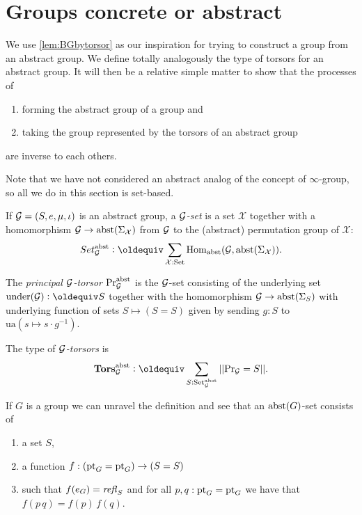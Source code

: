 \section{Groups concrete or abstract%
}
\label{sec:Gsetforabstract}

We use \cref{lem:BGbytorsor} as our inspiration for trying to construct a group from an abstract group.  We define totally analogously the type of torsors for an abstract group.  It will then be a relative simple matter to show that the processes of
\begin{enumerate}
\item forming the abstract group of a group and 
\item taking the group represented by the torsors of an abstract group
\end{enumerate}
 are inverse to each others.

Note that we have not considered an abstract analog of the concept of $\infty$-group, so all we do in this section is set-based.

\begin{definition}
\label{def:abstrGtorsors}
  If ${\mathcal G}=(S,e,\mu,\iota)$ is an abstract group, a \emph{$\mathcal G$-set} is a set $\mathcal X$ together with a homomorphism
$\mathcal G\to\mathrm{abst}(\Sigma_{\mathcal X})$
from $\mathcal G$ to the (abstract) permutation group of $\mathcal X$:
$$Set_{\agp G}^\abstr\defequi \sum_{\mathcal X:\Set}\Hom_\abstr({\agp G},\abstr(\Sigma_{\mathcal X})).$$

The \emph{principal ${\mathcal G}$-torsor} $\mathrm{Pr}_{{\mathcal G}}^{\mathrm{abst}}$ is the ${\mathcal G}$-set consisting of the underlying set $\mathrm{under}({\agp G})\defequi S$ together with the homomorphism ${\mathcal G}\to\mathrm{abst}(\Sigma_{S})$ with underlying function of sets $S\mapsto (S=S)$ given by sending $g:S$ to $\mathrm{ua}(s\mapsto s\cdot g^{-1})$.

The type of \emph{${\mathcal G}$-torsors} is
$$\typetorsor_{\agp G}^\abstr\defequi\sum_{S:\Set_{\agp G}^\abstr}||\princ {\agp G}=S||.$$
\end{definition}
\begin{example}
  If $G$ is a group we can unravel the definition and see that an $\mathrm{abst}(G)$-set consists of
  \begin{enumerate}
  \item a set $S$, 
  \item a function $f:({\mathord{\mathrm{pt}}}_G={\mathord{\mathrm{pt}}}_G)\to (S=S)$ 
  \item such that $f(e_G)=\mathop{{\it refl}_{S}}$ and for all $p,q:{\mathord{\mathrm{pt}}}_G={\mathord{\mathrm{pt}}}_G$ we have that $f(p\, q)=f(p)\,f(q)$.
  \end{enumerate}

\end{example}


